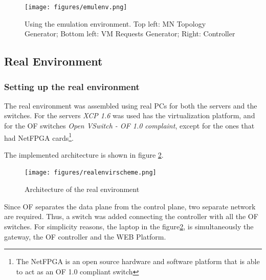 \documentclass[12pt,english,oneside]{book}
\begin{document}
\begin{figure}[h!tbp]
        \centering
        \texttt{[image: figures/emulenv.png]}
        \caption{Using the emulation environment. Top left: MN Topology Generator; Bottom left: VM Requests Generator; Right: Controller}
        \label{fig:emulenv}
\end{figure}

\newpage

\subsection{Real Environment}

\subsubsection{Setting up the real environment}
\hspace{0.6cm}

The real environment was assembled using real PCs for both the servers and the switches.
For the servers \textit{XCP 1.6} was used has the virtualization platform, and for the OF switches \textit{Open VSwitch - OF 1.0 complaint}, except for the ones that had NetFPGA cards\footnote{The NetFPGA is an open source hardware and software platform that is able to act as an OF 1.0 compliant switch}.

The implemented architecture is shown in figure \ref{fig:realenvarch}.

\begin{figure}[h!tbp]
        \centering
        \texttt{[image: figures/realenvirscheme.png]}
        \caption{Architecture of the real environment}
        \label{fig:realenvarch}
\end{figure}

Since OF separates the data plane from the control plane, two separate network are required. Thus, a switch was added connecting the controller with all the OF switches.
For simplicity reasons, the laptop in the figure\ref{fig:realenvarch}, is simultaneously the gateway, the OF controller and the WEB Platform.
\end{document}
